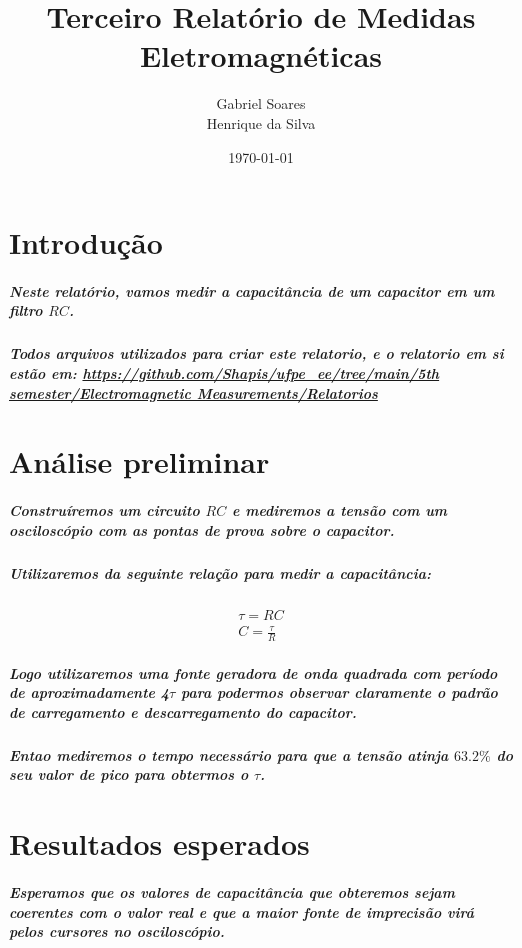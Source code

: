 \documentclass[12pt,twoside, a4paper, twocolumn]{article}
\title{Terceiro Relatório de Medidas Eletromagnéticas}
\author{Gabriel Soares \\ Henrique da Silva}
\date{\today}
\begin{document}
\maketitle
{}
\newpage
\tableofcontents
\newpage



\section{Introdução}


\subparagraph*{Neste relatório, vamos medir a capacitância de um capacitor em um filtro $RC$.}

\subparagraph*{Todos arquivos utilizados para criar este relatorio, e o relatorio em si estão em:  \url{https://github.com/Shapis/ufpe_ee/tree/main/5th semester/Electromagnetic Measurements/Relatorios}}




\section{Análise preliminar}

\subparagraph*{Construíremos um circuito $RC$ e mediremos a tensão com um osciloscópio com as pontas de prova sobre o capacitor.}

\subparagraph*{Utilizaremos da seguinte relação para medir a capacitância:}

\begin{equation}
    \begin{aligned}
        \tau = RC \\
        C = \frac{\tau}{R}
    \end{aligned}
\end{equation}

\subparagraph*{Logo utilizaremos uma fonte geradora de onda quadrada com período de aproximadamente 4$\tau$ para podermos observar claramente o padrão de carregamento e descarregamento do capacitor.}

\subparagraph*{Entao mediremos o tempo necessário para que a tensão atinja $63.2\%$ do seu valor de pico para obtermos o $\tau$.}

\section{Resultados esperados}

\subparagraph*{Esperamos que os valores de capacitância que obteremos sejam coerentes com o valor real e que a maior fonte de imprecisão virá pelos cursores no osciloscópio.}
\end{document}
